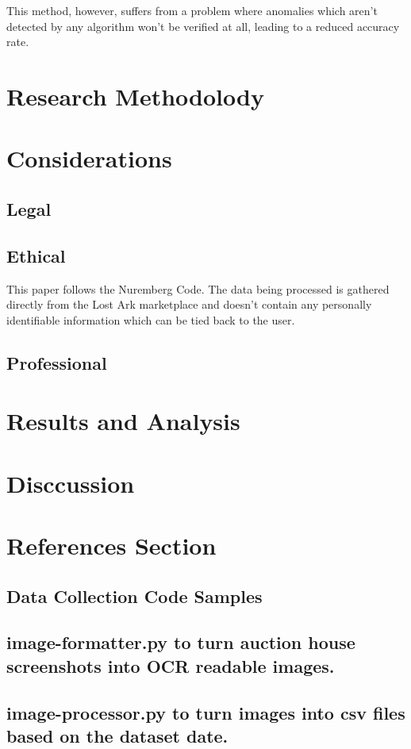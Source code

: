 \documentclass[journal]{IEEEtran}
\begin{document}
This method, however, suffers from a problem where anomalies which aren't detected by any algorithm won't be verified at all, leading to a reduced accuracy rate.

\section{Research Methodolody}

\section{Considerations}
\subsection{Legal}
\noindent 

\subsection{Ethical}
\noindent This paper follows the Nuremberg Code\cite{Nuremberg1947}.
The data being processed is gathered directly from the Lost Ark marketplace and doesn't contain any personally identifiable information which can be tied back to the user.

\subsection{Professional}
\noindent 

\section{Results and Analysis}
\noindent 

\section{Disccussion}
\noindent

\section{References Section}
\printbibliography

\begin{appendices}
    \section{Data Collection Code Samples}
    \label{appendix:collection-code}
    \subsection{image-formatter.py to turn auction house screenshots into OCR readable images.}
    \label{algorithm:image-formatter}
    
    \subsection{image-processor.py to turn images into csv files based on the dataset date.}
    \label{algorithm:image-processor}
    
\end{appendices}
\end{document}
